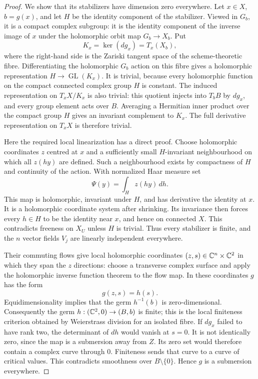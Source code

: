 \begin{proof}
We show that its stabilizers have dimension zero everywhere.
Let $x\in X$, $b=g(x)$, and let $H$ be the identity component
of the stabilizer.  Viewed in $G_b$, it is a compact complex
subgroup: it is the identity component of the inverse image
of $x$ under the holomorphic orbit map $G_b\to X_b$.
Put
\[
 K_x=\ker(dg_x)=T_x(X_b),
\]
where the right-hand side is the Zariski tangent space of
the scheme-theoretic fibre.  Differentiating the holomorphic
$G_b$ action on this fibre gives a holomorphic representation
$H\to\operatorname{GL}(K_x)$.  It is trivial, because every
holomorphic function on the compact connected complex group
$H$ is constant.  The induced representation on
$T_xX/K_x$ is also trivial: this quotient injects into
$T_bB$ by $dg_x$, and every group element acts over $B$.
Averaging a Hermitian inner product over the compact group
$H$ gives an invariant complement to $K_x$.  The full
derivative representation on $T_xX$ is therefore trivial.

Here the required local linearization has a direct proof.
Choose holomorphic coordinates $z$ centred at $x$ and a
sufficiently small $H$-invariant neighbourhood on which all
$z(hy)$ are defined.  Such a neighbourhood exists by
compactness of $H$ and continuity of the action.  With
normalized Haar measure set
\[
 \Psi(y)=\int_H z(hy)\,dh.
\]
This map is holomorphic, invariant under $H$, and has
derivative the identity at $x$.  It is a holomorphic
coordinate system after shrinking.  Its invariance then
forces every $h\in H$ to be the identity near $x$, and hence
on connected $X$.  This contradicts freeness on $X_U$ unless
$H$ is trivial.  Thus every stabilizer is finite, and the
$n$ vector fields $V_j$ are linearly independent everywhere.

Their commuting flows give local holomorphic coordinates
$(z,s)\in\mathbb C^n\times\mathbb C^2$ in which they span the $z$
directions: choose a transverse complex surface and apply
the holomorphic inverse function theorem to the flow map.
In these coordinates $g$ has the form
\[
 g(z,s)=h(s).
\]
Equidimensionality implies that the germ $h^{-1}(b)$ is
zero-dimensional.  Consequently the germ
$h:(\mathbb C^2,0)\to(B,b)$ is finite; this is the local finiteness
criterion obtained by Weierstrass division for an isolated
fibre.  If $dg_x$ failed to have rank two, the determinant
of $dh$ would vanish at $s=0$.  It is not identically zero,
since the map is a submersion away from $Z$.  Its zero set
would therefore contain a complex curve through $0$.
Finiteness sends that curve to a curve of critical values.
This contradicts smoothness over $B\setminus\{0\}$.
Hence $g$ is a submersion everywhere.


\end{proof}
